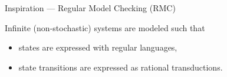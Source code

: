 \documentclass[
    hyperref = {hidelinks, linkcolor = black},
    xcolor = {dvipsnames},
    10pt
    aspectration = 169
]{beamer}
\begin{document}
    \begin{frame}{Inspiration --- Regular Model Checking (RMC)}

        \footnotesize Infinite (non-stochastic) systems are modeled such that
        \begin{itemize}
            \item states are expressed with regular languages,
            \item state transitions are expressed as rational transductions.
        \end{itemize}

            
    
    
    

    

\end{frame}
\end{document}
